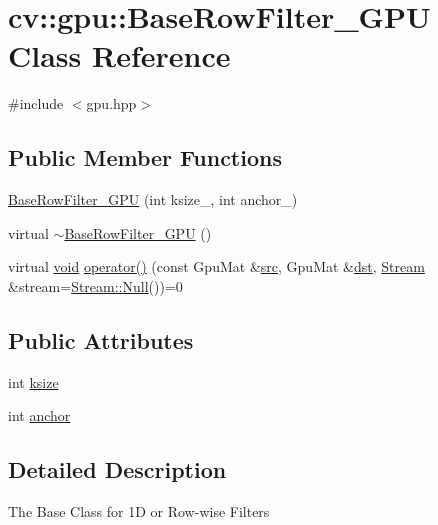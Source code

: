 \hypertarget{classcv_1_1gpu_1_1BaseRowFilter__GPU}{\section{cv\-:\-:gpu\-:\-:Base\-Row\-Filter\-\_\-\-G\-P\-U Class Reference}
\label{classcv_1_1gpu_1_1BaseRowFilter__GPU}
}


{\ttfamily \#include $<$gpu.\-hpp$>$}

\subsection*{Public Member Functions}
\begin{DoxyCompactItemize}
\item 
\hyperlink{classcv_1_1gpu_1_1BaseRowFilter__GPU_a7121438e5db45a777d0453fd25d96ead}{Base\-Row\-Filter\-\_\-\-G\-P\-U} (int ksize\-\_\-, int anchor\-\_\-)
\item 
virtual \hyperlink{classcv_1_1gpu_1_1BaseRowFilter__GPU_af3f6539f6fccc43c07920bc9dacbd00a}{$\sim$\-Base\-Row\-Filter\-\_\-\-G\-P\-U} ()
\item 
virtual \hyperlink{legacy_8hpp_a8bb47f092d473522721002c86c13b94e}{void} \hyperlink{classcv_1_1gpu_1_1BaseRowFilter__GPU_aa7a0ad3bfebfabcc7abcb7e3058b2c9a}{operator()} (const Gpu\-Mat \&\hyperlink{legacy_8hpp_a371cd109b74033bc4366f584edd3dacc}{src}, Gpu\-Mat \&\hyperlink{photo__c_8h_aed13e2a25279b24dc954073233fef7a5}{dst}, \hyperlink{classcv_1_1gpu_1_1Stream}{Stream} \&stream=\hyperlink{classcv_1_1gpu_1_1Stream_af96c23564834f88333dcb8997df553f1}{Stream\-::\-Null}())=0
\end{DoxyCompactItemize}
\subsection*{Public Attributes}
\begin{DoxyCompactItemize}
\item 
int \hyperlink{classcv_1_1gpu_1_1BaseRowFilter__GPU_a913539544c388aa5194776cf1b918b91}{ksize}
\item 
int \hyperlink{classcv_1_1gpu_1_1BaseRowFilter__GPU_aa900d2965b5818209c0f91f75881a2b3}{anchor}
\end{DoxyCompactItemize}


\subsection{Detailed Description}
The Base Class for 1\-D or Row-\/wise Filters

